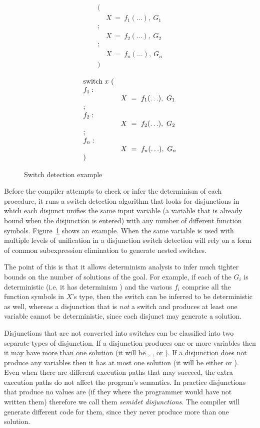 \begin{figure}
\parbox{0.5\textwidth}{
$$
\begin{array}{ll}
(\\
& X~=~f_1(\ldots),~G_1 \\
; \\
& X~=~f_2(\ldots),~G_2 \\
; \\
& X~=~f_n(\ldots),~G_n \\
)
\end{array}
$$}%
\parbox{0.5\textwidth}{
$$
\begin{array}{ll}
\hbox{switch}~x~( \\
f_1: \\
& X~=~f_1(\ldots),~G_1 \\
; \\
f_2: \\
& X~=~f_2(\ldots),~G_2 \\
; \\
f_n: \\
& X~=~f_n(\ldots),~G_n \\
)
\end{array}
$$}
\caption{Switch detection example}
\label{fig:switch_detect}
\end{figure}

Before the compiler attempts to check or infer
the determinism of each procedure,
it runs a switch detection algorithm that looks for disjunctions
in which each disjunct unifies the same input variable
(a variable that is already bound when the disjunction is entered)
with any number of different function symbols.
Figure~\ref{fig:switch_detect} shows an example.
When the same variable is used with multiple levels of unification in a
disjunction switch detection will rely on
a form of common subexpression elimination
to generate nested switches.

The point of this is that it allows determinism analysis
to infer much tighter bounds on the number of solutions of the goal.
For example, if each of the $G_i$ is deterministic
(i.e. it has determinism \ddet)
and the various $f_i$ comprise all the function symbols in $X$'s type,
then the switch can be inferred to be deterministic as well,
whereas a disjunction that is \emph{not} a switch and produces at least one
variable
cannot be deterministic,
since each disjunct may generate a solution.

Disjunctions that are not converted into switches can be classified into two
separate types of disjunction.
If a disjunction produces one or more variables
then it may have more than one solution
(it will be \dnondet, \dmulti, \dccnondet or \dccmulti).
If a disjunction does not produce any variables
then it has at most one solution
(it will be either \dsemidet or \ddet).
Even when there are different execution paths that may succeed,
the extra execution paths do not affect the program's semantics.
In practice disjunctions that produce no values are \dsemidet
(if they where \ddet the programmer would have not written them)
therefore we call them \emph{semidet disjunctions}.
The compiler will generate different code for them,
since they never produce more than one solution.

